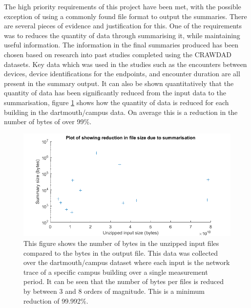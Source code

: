 The high priority requirements of this project have been met, with the possible exception of using a commonly found file format to output the summaries. There are several pieces of evidence and justification for this. One of the requirements was to reduces the quantity of data through summarising it, while maintaining useful information. The information in the final summaries produced has been chosen based on research into past studies completed using the CRAWDAD datasets. Key data which was used in the studies such as the encounters between devices, device identifications for the endpoints, and encounter duration are all present in the summary output. It can also be shown quantitatively that the quantity of data has been significantly reduced from the input data to the summarisation, figure \ref{fig:size_red} shows how the quantity of data is reduced for each building in the dartmouth/campus data. On average this is a reduction in the number of bytes of over 99\%. 

\begin{figure}[h]
    \centering
    \includegraphics[width=\textwidth]{size_red.png}
    \caption{This figure shows the number of bytes in the unzipped input files compared to the bytes in the output file. This data was collected over the dartmouth/campus dataset where each input is the network trace of a specific campus building over a single measurement period. It can be seen that the number of bytes per files is reduced by between 3 and 8 orders of magnitude. This is a minimum reduction of 99.992\%.}
    \label{fig:size_red}
\end{figure}

